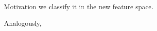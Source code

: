 \documentclass[11pt,compress,t,notes=noshow]{beamer}
\begin{document}
\begin{frame} {Motivation}
   \small{we classify it in the new feature space.}
  \begin{figure}
    \centering
  \end{figure}
  \small{Analogously, }
  \begin{figure}
    \centering
  \end{figure}
\end{frame}
\end{document}
